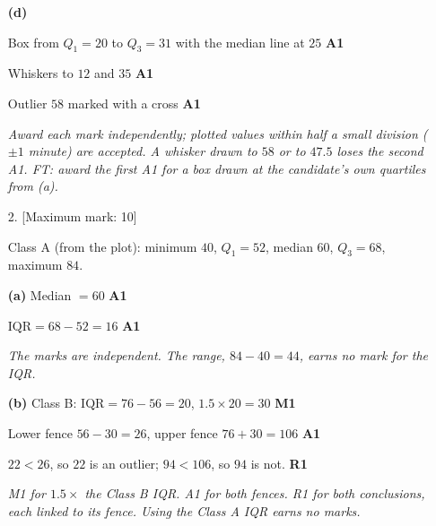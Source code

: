 \documentclass[12pt, twoside]{article}
\begin{document}
\begin{enumerate}[itemsep=0.3cm]
\textbf{(d)}

\begin{center}
\end{center}

Box from $Q_{1} = 20$ to $Q_{3} = 31$ with the median line at $25$
\hfill \textbf{A1}

Whiskers to $12$ and $35$ \hfill \textbf{A1}

Outlier $58$ marked with a cross \hfill \textbf{A1}

\emph{Award each mark independently; plotted values within half a small
division ($\pm 1$ minute) are accepted. A whisker drawn to $58$ or to $47.5$
loses the second A1. FT: award the first A1 for a box drawn at the
candidate's own quartiles from (a).}

\newpage

\item[2.] [Maximum mark: 10]

Class A (from the plot): minimum $40$, $Q_{1} = 52$, median $60$,
$Q_{3} = 68$, maximum $84$.

\textbf{(a)} Median $= 60$ \hfill \textbf{A1}

$\text{IQR} = 68 - 52 = 16$ \hfill \textbf{A1}

\emph{The marks are independent. The range, $84 - 40 = 44$, earns no mark for
the IQR.}

\textbf{(b)} Class B: $\text{IQR} = 76 - 56 = 20$, \quad
$1.5 \times 20 = 30$ \hfill \textbf{M1}

Lower fence $56 - 30 = 26$, \quad upper fence $76 + 30 = 106$
\hfill \textbf{A1}

$22 < 26$, so $22$ is an outlier; $94 < 106$, so $94$ is not.
\hfill \textbf{R1}

\emph{M1 for $1.5 \times$ the Class B IQR. A1 for both fences. R1 for both
conclusions, each linked to its fence. Using the Class A IQR earns no
marks.}


\end{enumerate}
\end{document}
